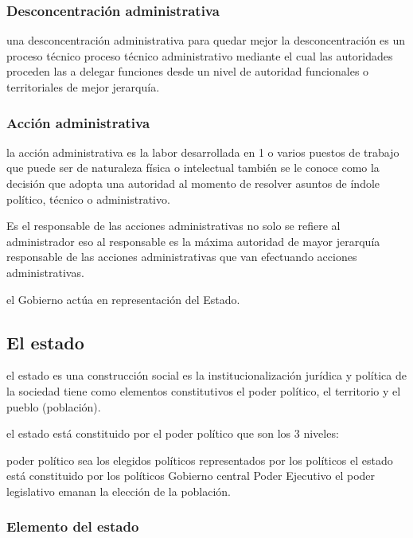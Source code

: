\documentclass[
  jou,
  floatsintext,
  longtable,
  a4paper,
  nolmodern,
  notxfonts,
  notimes,
  12pt,
  colorlinks=true,linkcolor=blue,citecolor=blue,urlcolor=blue]{apa7}
\begin{document}
\subsubsection{Desconcentración
administrativa}\label{desconcentraciuxf3n-administrativa}

una desconcentración administrativa para quedar mejor la
desconcentración es un proceso técnico proceso técnico administrativo
mediante el cual las autoridades proceden las a delegar funciones desde
un nivel de autoridad funcionales o territoriales de mejor jerarquía.

\subsubsection{Acción administrativa}\label{acciuxf3n-administrativa}

la acción administrativa es la labor desarrollada en 1 o varios puestos
de trabajo que puede ser de naturaleza física o intelectual también se
le conoce como la decisión que adopta una autoridad al momento de
resolver asuntos de índole político, técnico o administrativo.

Es el responsable de las acciones administrativas no solo se refiere al
administrador eso al responsable es la máxima autoridad de mayor
jerarquía responsable de las acciones administrativas que van efectuando
acciones administrativas.

el Gobierno actúa en representación del Estado.

\subsection{El estado}\label{el-estado}

el estado es una construcción social es la institucionalización jurídica
y política de la sociedad tiene como elementos constitutivos el poder
político, el territorio y el pueblo (población).

el estado está constituido por el poder político que son los 3 niveles:

poder político sea los elegidos políticos representados por los
políticos el estado está constituido por los políticos Gobierno central
Poder Ejecutivo el poder legislativo emanan la elección de la población.

\subsubsection{Elemento del estado}\label{elemento-del-estado}
\end{document}
